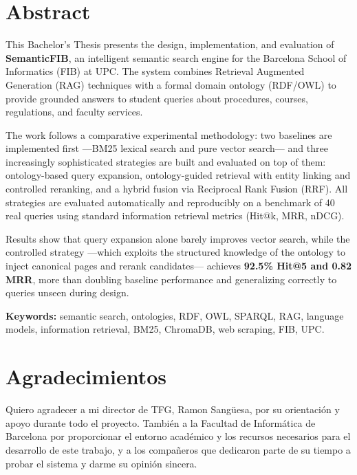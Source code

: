 \documentclass[12pt, a4paper, twoside]{report}
\begin{document}
\vspace{1cm}

\chapter*{Abstract}

This Bachelor's Thesis presents the design, implementation, and evaluation of \textbf{SemanticFIB}, an intelligent semantic search engine for the Barcelona School of Informatics (FIB) at UPC. The system combines Retrieval Augmented Generation (RAG) techniques with a formal domain ontology (RDF/OWL) to provide grounded answers to student queries about procedures, courses, regulations, and faculty services.

The work follows a comparative experimental methodology: two baselines are implemented first ---BM25 lexical search and pure vector search--- and three increasingly sophisticated strategies are built and evaluated on top of them: ontology-based query expansion, ontology-guided retrieval with entity linking and controlled reranking, and a hybrid fusion via Reciprocal Rank Fusion (RRF). All strategies are evaluated automatically and reproducibly on a benchmark of 40 real queries using standard information retrieval metrics (Hit@k, MRR, nDCG).

Results show that query expansion alone barely improves vector search, while the controlled strategy ---which exploits the structured knowledge of the ontology to inject canonical pages and rerank candidates--- achieves \textbf{92.5\% Hit@5 and 0.82 MRR}, more than doubling baseline performance and generalizing correctly to queries unseen during design.

\textbf{Keywords:} semantic search, ontologies, RDF, OWL, SPARQL, RAG, language models, information retrieval, BM25, ChromaDB, web scraping, FIB, UPC.

\chapter*{Agradecimientos}

Quiero agradecer a mi director de TFG, Ramon Sang\"uesa, por su orientaci\'on y apoyo durante todo el proyecto. Tambi\'en a la Facultad de Inform\'atica de Barcelona por proporcionar el entorno acad\'emico y los recursos necesarios para el desarrollo de este trabajo, y a los compa\~neros que dedicaron parte de su tiempo a probar el sistema y darme su opini\'on sincera.
\end{document}

